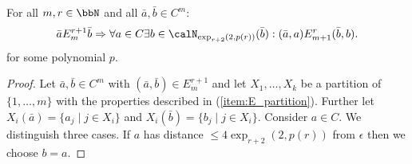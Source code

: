 \begin{lemma}\label{lem:EF_relations}
	For all $m,r\in\bbN$ and all $\bar{a},\bar{b}\in C^m$:  
	\[\bar{a} E^{r+1}_m \bar{b} \Rightarrow \forall a\in C \exists b\in \calN_{\exp_{r+2}(2,p(r))}(\bar{b}): (\bar{a}, a) E^{r}_{m+1} (\bar{b}, b).\]
	for some polynomial $p$.
\end{lemma}
\begin{proof}
	Let $\bar{a}, \bar{b} \in C^m$ with $(\bar{a}, \bar{b}) \in E^{r+1}_m$ and 
	let $X_1,\ldots,X_k$ be a partition of $\{1,\ldots,m\}$ with the properties described in (\ref{item:E_partition}). Further let $X_i(\bar{a}) = \{a_j \mid j\in X_i \}$ and $X_i(\bar{b}) = \{b_j \mid j\in X_i \}$. Consider $a\in C$. We distinguish three cases.
	If $a$ has distance $\leq 4\exp_{r+2}(2, p(r))$ from $\epsilon$ then we choose $b=a$.
	

\end{proof}
